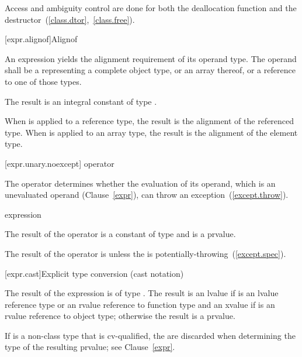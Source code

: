 \pnum
Access and ambiguity control are done for both the deallocation function
and the destructor~(\ref{class.dtor},~\ref{class.free}).

[expr.alignof]{Alignof}

\pnum
{}%
An  expression yields the alignment requirement
of its operand type. The operand shall be a 
representing a complete object type, or an array thereof, or a reference
to one of those types.

\pnum
The result is an integral constant of type
.

\pnum
When  is applied to a reference type, the result
is the alignment of the referenced type. When 
is applied to an array type, the result is the alignment of the
element type.

[expr.unary.noexcept]{ operator}

\pnum
{}%
The  operator determines whether the evaluation of its operand,
which is an unevaluated operand (Clause~\ref{expr}), can throw an
exception~(\ref{except.throw}).

\begin{bnf}
\br
   \terminal{(} expression \terminal{)}
\end{bnf}

\pnum
The result of the  operator is a constant of type 
and is a prvalue.

\pnum
The result of the  operator is 
unless the  is potentially-throwing~(\ref{except.spec}).

[expr.cast]{Explicit type conversion (cast notation)}%

\pnum
The result of the expression   is
of type . The result is an lvalue if  is an lvalue
reference type or an rvalue reference to function type and an xvalue if 
is an rvalue reference to object type; otherwise the result is a prvalue.
\begin{note}
If  is a non-class type that is cv-qualified, the
 are discarded when determining the type of the
resulting prvalue; see Clause~\ref{expr}.
\end{note}

